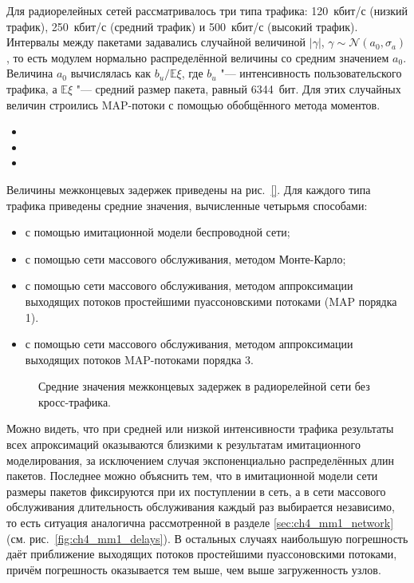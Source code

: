 Для радиорелейных сетей рассматривалось три типа трафика: 120~кбит/с (низкий трафик), 250~кбит/с (средний трафик) и 500~кбит/с (высокий трафик). Интервалы между пакетами задавались случайной величиной $|\gamma|$, $\gamma \sim \mathcal{N}(a_0, \sigma_a)$, то есть модулем нормально распределённой величины со средним значением $a_0$. Величина $a_0$ вычислялась как $b_u / \mathbb{E}\xi$, где $b_u$ "--- интенсивность пользовательского трафика, а $\mathbb{E}\xi$ "--- средний размер пакета, равный 6344~бит. Для этих случайных величин строились MAP-потоки с помощью обобщённого метода моментов.

\begin{itemize}
\item{}
\item{}
\item{}
\end{itemize}

Величины межконцевых задержек приведены на рис.~\ref{}. Для каждого типа трафика приведены средние значения, вычисленные четырьмя способами:

\begin{itemize}
\item с помощью имитационной модели беспроводной сети;
\item с помощью сети массового обслуживания, методом Монте-Карло;
\item с помощью сети массового обслуживания, методом аппроксимации выходящих потоков простейшими пуассоновскими потоками (MAP порядка 1).
\item с помощью сети массового обслуживания, методом аппроксимации выходящих потоков MAP-потоками порядка 3.
\end{itemize}

\begin{figure}[h]
  \caption{Средние значения межконцевых задержек в радиорелейной сети без кросс-трафика.}
  \label{fig:ch4_relay_delays}
\end{figure}

Можно видеть, что при средней или низкой интенсивности трафика результаты всех апроксимаций оказываются близкими к результатам имитационного моделирования, за исключением случая экспоненциально распределённых длин пакетов. Последнее можно объяснить тем, что в имитационной модели сети размеры пакетов фиксируются при их поступлении в сеть, а в сети массового обслуживания длительность обслуживания каждый раз выбирается независимо, то есть ситуация аналогична рассмотренной в разделе \ref{sec:ch4_mm1_network} (см. рис.~\ref{fig:ch4_mm1_delays}). В остальных случаях наибольшую погрешность даёт приближение выходящих потоков простейшими пуассоновскими потоками, причём погрешность оказывается тем выше, чем выше загруженность узлов.

